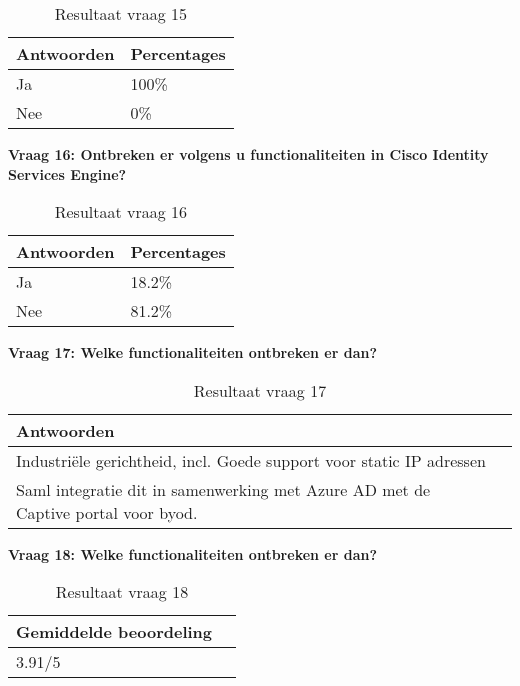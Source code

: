 \begin{table}[H]
	\begin{center}
		\begin{tabular}{|l|l|}
			\hline
\bf Antwoorden    & \bf Percentages \\ \hline
Ja      & 100\% \\ \hline
Nee     & 0\%    \\ \hline                                                                                                                                 
		\end{tabular}
		\caption{Resultaat vraag 15}
	\end{center}
\end{table}

\textbf{Vraag 16: Ontbreken er volgens u functionaliteiten in Cisco Identity Services Engine?}

\begin{table}[H]
	\begin{center}
		\begin{tabular}{|l|l|}
		\hline
		\bf Antwoorden    & \bf Percentages \\ \hline
		Ja      & 18.2\% \\ \hline
		Nee     & 81.2\%    \\ \hline                                                         
		\end{tabular}
		\caption{Resultaat vraag 16}
	\end{center}
\end{table}

\textbf{Vraag 17: Welke functionaliteiten ontbreken er dan?}

\begin{table}[H]
	\begin{center}
		\begin{tabular}{|l|l|}
			\hline
		\bf Antwoorden                                                                        \\ \hline
		Industriële gerichtheid, incl. Goede support voor static IP adressen              \\ \hline
		Saml integratie dit in samenwerking met Azure AD met de Captive portal voor byod. \\ \hline                                                      
		\end{tabular}
		\caption{Resultaat vraag 17}
	\end{center}
\end{table}

\textbf{Vraag 18: Welke functionaliteiten ontbreken er dan?}
\begin{table}[H]
	\begin{center}
		\begin{tabular}{|l|l|}
			\hline
			\bf Gemiddelde beoordeling                                                                        \\ \hline
			3.91/5 \\ \hline                                                   
		\end{tabular}
		\caption{Resultaat vraag 18}
	\end{center}
\end{table}

